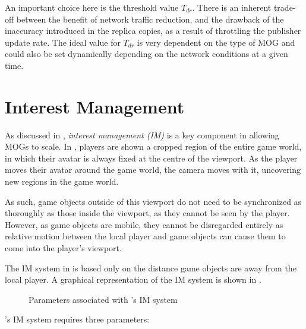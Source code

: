 An important choice here is the threshold value $T_{dr}$. There is an inherent trade-off between the benefit of network traffic reduction, and the drawback of the inaccuracy introduced in the replica copies, as a result of throttling the publisher update rate. The ideal value for $T_{dr}$ is very dependent on the type of MOG and could also be set dynamically depending on the network conditions at a given time.


\section{Interest Management}\label{sec:des:im}
As discussed in , \textit{interest management (IM)} is a key component in allowing MOGs to scale. In \game{}, players are shown a cropped region of the entire game world, in which their avatar is always fixed at the centre of the viewport. As the player moves their avatar around the game world, the camera moves with it, uncovering new regions in the game world.

As such, game objects outside of this viewport do not need to be synchronized as thoroughly as those inside the viewport, as they cannot be seen by the player. However, as game objects are mobile, they cannot be disregarded entirely as relative motion between the local player and game objects can cause them to come into the player's viewport. 

The IM system in \game{} is based only on the distance game objects are away from the local player. A graphical representation of the IM system is shown in .

\begin{figure}[H]
    \centering
    \caption{Parameters associated with \game{}'s IM system}
    \label{fig:des:interest-regions}
\end{figure}

\game{}'s IM system requires three parameters:

